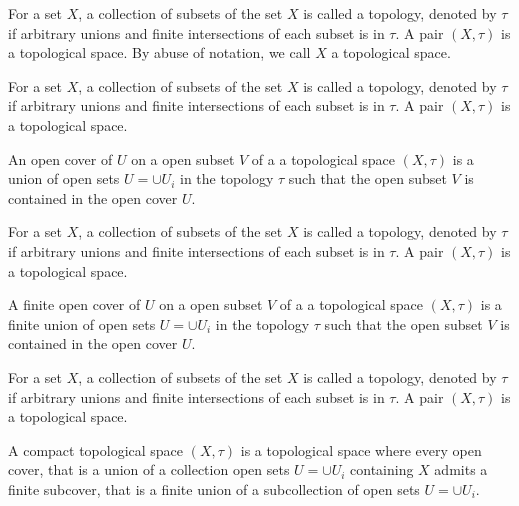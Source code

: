 \begin{definition}
	\label{definition-topological-space}
	For a set $X$, a collection of subsets 
	of the set $X$ is called a topology, denoted by $\tau$ 
	if arbitrary unions and finite intersections of each subset
	is in $\tau$. A pair $(X, \tau)$ is a topological space.
	By abuse of notation, we call $X$ a topological space.
\end{definition}

\begin{definition}
	\label{definition-open-cover}
	For a set $X$, a collection of subsets 
	of the set $X$ is called a topology, denoted by $\tau$ 
	if arbitrary unions and finite intersections of each subset
	is in $\tau$. A pair $(X, \tau)$ is a topological space.
	
	An open cover of $U$ on a open subset $V$
	of a a topological space $(X, \tau)$
	is a union of open sets $U = \cup U_i$ in 
	the topology $\tau$ such that 
	the open subset $V$ is contained in the open cover $U$.
\end{definition}

\begin{definition}
	\label{definition-finite-open-cover}
	For a set $X$, a collection of subsets 
	of the set $X$ is called a topology, denoted by $\tau$ 
	if arbitrary unions and finite intersections of each subset is in $\tau$. A pair $(X, \tau)$ is a topological space.
	
	A finite open cover of $U$ on a open subset $V$
	of a a topological space $(X, \tau)$
	is a finite union of open sets $U = \cup U_i$ in 
	the topology $\tau$ such that 
	the open subset $V$ is contained in the open cover $U$.
\end{definition}

\begin{definition}
	\label{definition-compact-topological-space}
	For a set $X$, a collection of subsets 
	of the set $X$ is called a topology, denoted by $\tau$ 
	if arbitrary unions and finite intersections of each subset
	is in $\tau$. A pair $(X, \tau)$ is a topological space.
	
	A compact topological space $(X, \tau)$ is a topological space where every open cover, that is a union of a collection open sets $U = \cup U_i$ containing $X$
	admits a finite subcover, that is a finite union of 
	a subcollection of open sets $U = \cup U_i$.
\end{definition}

